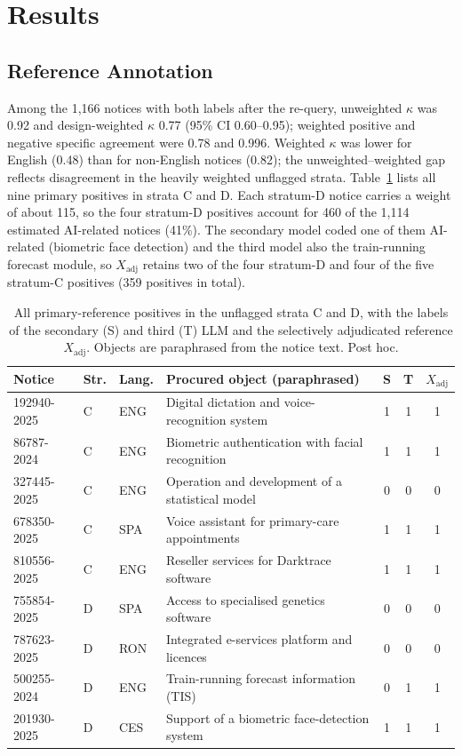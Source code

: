 \documentclass[runningheads]{llncs}
\begin{document}
\section{Results}
\subsection{Reference Annotation}
Among the 1,166 notices with both labels after the re-query, unweighted $\kappa$ was 0.92 and design-weighted $\kappa$ 0.77 (95\% CI 0.60--0.95); weighted positive and negative specific agreement were 0.78 and 0.996. Weighted $\kappa$ was lower for English (0.48) than for non-English notices (0.82); the unweighted--weighted gap reflects disagreement in the heavily weighted unflagged strata. Table~\ref{tab:cases} lists all nine primary positives in strata C and D. Each stratum-D notice carries a weight of about 115, so the four stratum-D positives account for 460 of the 1,114 estimated AI-related notices (41\%). The secondary model coded one of them AI-related (biometric face detection) and the third model also the train-running forecast module, so $X_{\mathrm{adj}}$ retains two of the four stratum-D and four of the five stratum-C positives (359 positives in total).

\begin{table}[t]
\caption{All primary-reference positives in the unflagged strata C and D, with the labels of the secondary (S) and third (T) LLM and the selectively adjudicated reference $X_{\mathrm{adj}}$. Objects are paraphrased from the notice text. Post hoc.}\label{tab:cases}
\centering
\begin{tabular}{llllccc}
\toprule
Notice & Str. & Lang. & Procured object (paraphrased) & S & T & $X_{\mathrm{adj}}$ \\
\midrule
192940-2025 & C & ENG & Digital dictation and voice-recognition system & 1 & 1 & 1 \\
86787-2024  & C & ENG & Biometric authentication with facial recognition & 1 & 1 & 1 \\
327445-2025 & C & ENG & Operation and development of a statistical model & 0 & 0 & 0 \\
678350-2025 & C & SPA & Voice assistant for primary-care appointments & 1 & 1 & 1 \\
810556-2025 & C & ENG & Reseller services for Darktrace software & 1 & 1 & 1 \\
755854-2025 & D & SPA & Access to specialised genetics software & 0 & 0 & 0 \\
787623-2025 & D & RON & Integrated e-services platform and licences & 0 & 0 & 0 \\
500255-2024 & D & ENG & Train-running forecast information (TIS) & 0 & 1 & 1 \\
201930-2025 & D & CES & Support of a biometric face-detection system & 1 & 1 & 1 \\
\bottomrule
\end{tabular}
\end{table}
\end{document}
